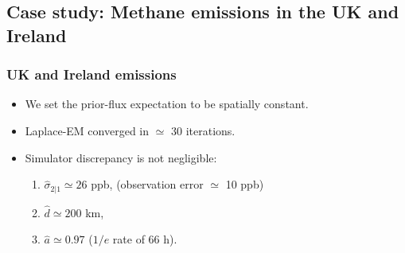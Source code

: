 \documentclass{beamer}
\begin{document}
\subsection{Case study: Methane emissions in the UK and Ireland}






\begin{frame}
\frametitle{UK and Ireland emissions}
\begin{itemize}
\item We set the prior-flux expectation to be spatially constant. \vfill
\item Laplace-EM converged in $\simeq$ 30 iterations. \vfill
\item Simulator discrepancy is not negligible: \vfill
\begin{enumerate}
\item $\hat\sigma_{2|1} \simeq 26$ ppb, (observation error $\simeq$  10 ppb)\vfill
\item $\hat d \simeq 200$ km, \vfill
\item $\hat a \simeq 0.97$ ($1/e$ rate of 66 h). \vfill
\end{enumerate}
\end{itemize}
\end{frame}
\end{document}
